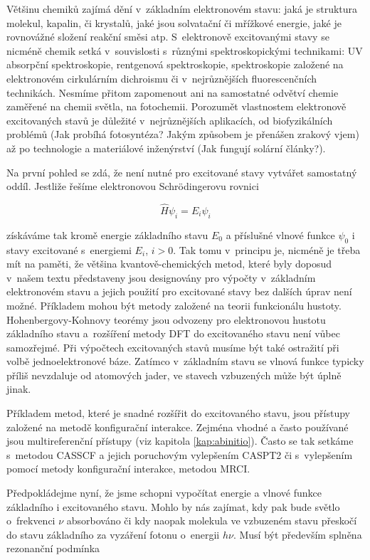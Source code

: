 Většinu chemiků zajímá dění v~základním elektronovém stavu: jaká je struktura molekul, kapalin, či krystalů, jaké jsou solvatační či mřížkové energie, jaké je rovnovážné složení reakční směsi atp. S~elektronově excitovanými stavy se nicméně chemik setká v~souvislosti s~různými spektroskopickými technikami: UV absorpční spektroskopie, rentgenová spektroskopie, spektroskopie založené na elektronovém cirkulárním dichroismu či v~nejrůznějších fluorescenčních technikách. Nesmíme přitom zapomenout ani na samostatné odvětví chemie zaměřené na chemii světla, na fotochemii. Porozumět vlastnostem elektronově excitovaných stavů je důležité v~nejrůznějších aplikacích, od biofyzikálních problémů (Jak probíhá fotosyntéza? Jakým  způsobem je přenášen zrakový vjem) až po technologie a materiálové inženýrství (Jak fungují solární články?). 

Na první pohled se zdá, že není nutné pro excitované stavy vytvářet samostatný oddíl. Jestliže řešíme elektronovou Schr\"odingerovu rovnici

\begin{equation}
\hat{H} \psi_i = E_i \psi_i
\label{rov:Ex-1}
\end{equation}

\noindent získáváme tak kromě energie základního stavu $E_0$ a příslušné vlnové funkce $\psi_0$ i stavy excitované s~energiemi $E_i$, $i > 0$. Tak tomu v~principu je, nicméně je třeba mít na paměti, že většina kvantově-chemických metod, které byly doposud v~našem textu představeny jsou designovány pro výpočty v~základním elektronovém stavu a jejich použití pro excitované stavy bez dalších úprav není možné. Příkladem mohou být metody založené na teorii funkcionálu hustoty. Hohenbergovy-Kohnovy teorémy jsou odvozeny pro elektronovou hustotu základního stavu a~rozšíření metody DFT do excitovaného stavu není vůbec samozřejmé. Při výpočtech excitovaných stavů musíme být také ostražití při volbě jednoelektronové báze. Zatímco v~základním stavu se vlnová funkce typicky příliš nevzdaluje od atomových jader, ve stavech vzbuzených může být úplně jinak.  

Příkladem metod, které je snadné rozšířit do excitovaného stavu, jsou přístupy založené na metodě konfigurační interakce. Zejména vhodné a často používané jsou multireferenční přístupy (viz kapitola \ref{kap:abinitio}). Často se tak setkáme s~metodou CASSCF a jejich poruchovým  vylepšením CASPT2 či s~vylepšením pomocí metody konfigurační interakce, metodou MRCI.   

Předpokládejme nyní, že jsme schopni vypočítat energie a vlnové funkce základního i excitovaného stavu. Mohlo by nás zajímat, kdy pak bude světlo o~frekvenci $\nu$ absorbováno či kdy naopak molekula ve vzbuzeném stavu přeskočí do stavu základního za vyzáření fotonu o~energii $h\nu$. Musí být především splněna rezonanční podmínka 



